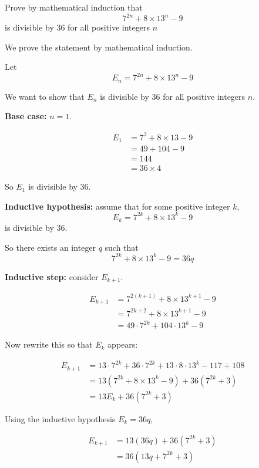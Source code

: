 \documentclass[leqno]{article}
\begin{document}
\begin{enumerate}[
  label=\textbf{\arabic*.},
  leftmargin=*,
  topsep=0pt,
  partopsep=0pt,
  parsep=0pt
]
Prove by mathematical induction that
\[
7^{2n}+8\times 13^n-9
\]
is divisible by $36$ for all positive integers $n$ 

\vspace*{30pt}

\begin{tcolorbox}[colback=white, colframe=scarlet, title={\textbf{Solution}}, breakable, grow to left by=6mm, grow to right by=10mm]
We prove the statement by mathematical induction.

Let
\[
E_n=7^{2n}+8\times 13^n-9
\]

We want to show that $E_n$ is divisible by $36$ for all positive integers $n$.

\textbf{Base case:} $n=1$.

\begin{align*}
E_1&=7^2+8\times 13-9\\
&=49+104-9\\
&=144\\
&=36\times 4
\end{align*}

So $E_1$ is divisible by $36$.

\textbf{Inductive hypothesis:} assume that for some positive integer $k$,
\[
E_k=7^{2k}+8\times 13^k-9
\]
is divisible by $36$.

So there exists an integer $q$ such that
\[
7^{2k}+8\times 13^k-9=36q
\]

\textbf{Inductive step:} consider $E_{k+1}$.

\begin{align*}
E_{k+1}
&=7^{2(k+1)}+8\times 13^{k+1}-9\\
&=7^{2k+2}+8\times 13^{k+1}-9\\
&=49\cdot 7^{2k}+104\cdot 13^k-9
\end{align*}

Now rewrite this so that $E_k$ appears:

\begin{align*}
E_{k+1}
&=13\cdot 7^{2k}+36\cdot 7^{2k}+13\cdot 8\cdot 13^k-117+108\\
&=13\left(7^{2k}+8\times 13^k-9\right)+36\left(7^{2k}+3\right)\\
&=13E_k+36\left(7^{2k}+3\right)
\end{align*}

Using the inductive hypothesis $E_k=36q$,

\begin{align*}
E_{k+1}
&=13(36q)+36\left(7^{2k}+3\right)\\
&=36\left(13q+7^{2k}+3\right)
\end{align*}


\end{tcolorbox}
\end{enumerate}
\end{document}
